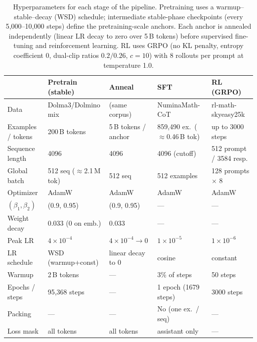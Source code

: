 \begin{table}[t]
\centering
\small
\setlength{\tabcolsep}{5pt}
\begin{tabular}{@{}lllll@{}}
\toprule
& \textbf{Pretrain (stable)} & \textbf{Anneal} & \textbf{SFT} & \textbf{RL (GRPO)} \\
\midrule
Data
  & Dolma3/Dolmino mix & (same corpus) & NuminaMath-CoT & rl-math-skyeasy25k \\
Examples / tokens
  & 200\,B tokens & 5\,B tokens / anchor & 859{,}490 ex.\ ($\approx$0.46\,B tok) & up to 3000 steps \\
Sequence length
  & 4096 & 4096 & 4096 (cutoff) & 512 prompt / 3584 resp. \\
Global batch
  & 512 seq ($\approx$2.1\,M tok) & 512 seq & 512 examples & 128 prompts $\times$ 8 \\
Optimizer
  & AdamW & AdamW & AdamW & AdamW \\
$(\beta_1,\beta_2)$
  & (0.9, 0.95) & (0.9, 0.95) & --- & --- \\
Weight decay
  & 0.033 (0 on emb.) & 0.033 & --- & --- \\
Peak LR
  & $4\times10^{-4}$ & $4\times10^{-4}\!\to\!0$ & $1\times10^{-5}$ & $1\times10^{-6}$ \\
LR schedule
  & WSD (warmup+const) & linear decay to 0 & cosine & constant \\
Warmup
  & 2\,B tokens & --- & 3\% of steps & 50 steps \\
Epochs / steps
  & 95{,}368 steps & --- & 1 epoch (1679 steps) & 3000 steps \\
Packing
  & --- & --- & No (one ex.\ / seq) & --- \\
Loss mask
  & all tokens & all tokens & assistant only & --- \\
\bottomrule
\end{tabular}
\caption{Hyperparameters for each stage of the pipeline. Pretraining uses a
warmup--stable--decay (WSD) schedule; intermediate stable-phase checkpoints
(every 5{,}000--10{,}000 steps) define the pretraining-scale anchors. Each
anchor is annealed independently (linear LR decay to zero over 5\,B tokens)
before supervised fine-tuning and reinforcement learning. RL uses GRPO
(no KL penalty, entropy coefficient 0, dual-clip ratios
$0.2/0.26$, $c=10$) with 8 rollouts per prompt at temperature 1.0.}
\label{tab:hparams}
\end{table}
